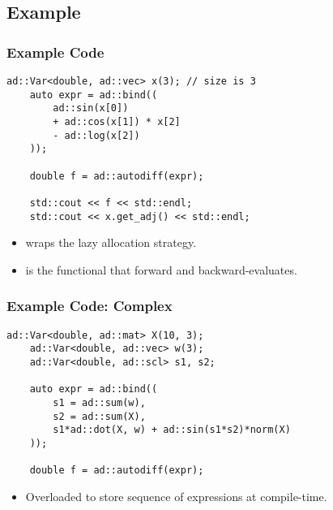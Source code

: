 \subsection{Example}
\frame{\tableofcontents[currentsubsection]}

\begin{frame}[fragile]
\frametitle{Example Code}
\begin{lstlisting}[style=customcpp]
    ad::Var<double, ad::vec> x(3); // size is 3
    auto expr = ad::bind((
        ad::sin(x[0]) 
        + ad::cos(x[1]) * x[2] 
        - ad::log(x[2])
    ));

    double f = ad::autodiff(expr);

    std::cout << f << std::endl;
    std::cout << x.get_adj() << std::endl;
\end{lstlisting}

\begin{itemize}
    
\item {} wraps the lazy allocation strategy.

\item {} is the functional that forward and backward-evaluates.

\end{itemize}
\end{frame}

\begin{frame}[fragile]
\frametitle{Example Code: Complex}
\begin{lstlisting}[style=customcpp]
    ad::Var<double, ad::mat> X(10, 3);
    ad::Var<double, ad::vec> w(3);
    ad::Var<double, ad::scl> s1, s2;

    auto expr = ad::bind((
        s1 = ad::sum(w),
        s2 = ad::sum(X),
        s1*ad::dot(X, w) + ad::sin(s1*s2)*norm(X)
    ));

    double f = ad::autodiff(expr);
\end{lstlisting}

\begin{itemize}
    
\item Overloaded  to store sequence of expressions at compile-time.

\end{itemize}
\end{frame}
